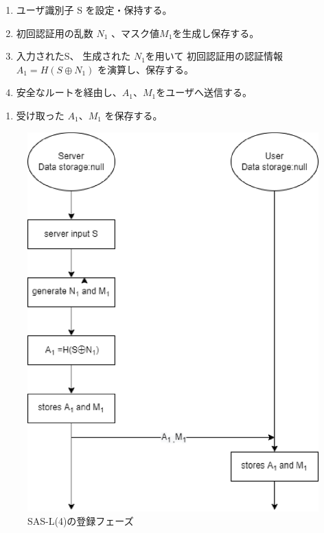 \documentclass{thesis}
\begin{document}
\begin{enumerate}[1.]
\item ユーザ識別子 S を設定・保持する。
				\item 初回認証用の乱数 $N_1$ 、マスク値$M_1$を生成し保存する。
				\item 入力されたS、 生成された $N_1$を用いて 初回認証用の認証情報$A_1 = H(S \oplus N_1)$ を演算し、保存する。
				\item 安全なルートを経由し、$A_1$、$M_1$をユーザへ送信する。
\end{enumerate}

\begin{enumerate}[1.]
\item 受け取った $A_1$、$M_1$ を保存する。
\end{enumerate}
%
\begin{figure}[H]
 \center
 \includegraphics[scale=0.75]{./image/sasl4first.eps}
 \caption{SAS-L(4)の登録フェーズ}
 \label{4f}
\end{figure}
%
\end{document}
